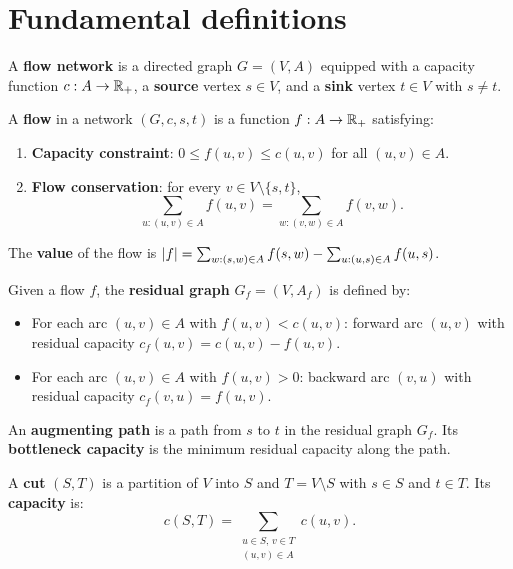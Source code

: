\section{Fundamental definitions}

\begin{definition}
A \textbf{flow network} is a directed graph $G = (V, A)$ equipped with a
capacity function $c : A \to \mathbb{R}_+$, a \textbf{source} vertex $s \in V$, and a
\textbf{sink} vertex $t \in V$ with $s \ne t$.
\end{definition}

\begin{definition}[Flow]
A \textbf{flow} in a network $(G, c, s, t)$ is a function $f : A \to \mathbb{R}_+$
satisfying:
\begin{enumerate}
  \item \textbf{Capacity constraint}: $0 \leq f(u,v) \leq c(u,v)$ for all
        $(u,v) \in A$.
  \item \textbf{Flow conservation}: for every $v \in V \setminus \{s, t\}$,
        \[
          \sum_{u : (u,v) \in A} f(u,v) = \sum_{w : (v,w) \in A} f(v,w).
        \]
\end{enumerate}
The \textbf{value} of the flow is $\left| f \right| = \sum_{w : (s,w) \in A} f(s,w)
- \sum_{u : (u,s) \in A} f(u,s)$.
\end{definition}

\begin{definition}
Given a flow $f$, the \textbf{residual graph} $G_f = (V, A_f)$ is defined by:
\begin{itemize}
  \item For each arc $(u,v) \in A$ with $f(u,v) < c(u,v)$: forward arc
        $(u,v)$ with residual capacity $c_f(u,v) = c(u,v) - f(u,v)$.
  \item For each arc $(u,v) \in A$ with $f(u,v) > 0$: backward arc $(v,u)$
        with residual capacity $c_f(v,u) = f(u,v)$.
\end{itemize}
\end{definition}

\begin{definition}
An \textbf{augmenting path} is a path from $s$ to $t$ in the residual graph
$G_f$. Its \textbf{bottleneck capacity} is the minimum residual capacity
along the path.
\end{definition}

\begin{definition}[Cut]
A \textbf{cut} $(S, T)$ is a partition of $V$ into $S$ and $T = V \setminus S$
with $s \in S$ and $t \in T$. Its \textbf{capacity} is:
\[
  c(S, T) = \sum_{\substack{u \in S,\, v \in T \\ (u,v) \in A}} c(u,v).
\]
\end{definition}

